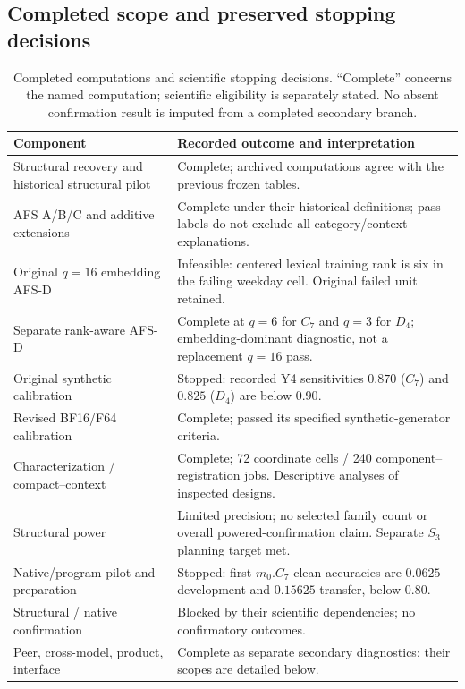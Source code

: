 \subsection{Completed scope and preserved stopping decisions}
\begin{table}[H]\centering\small
\caption{Completed computations and scientific stopping decisions. ``Complete'' concerns the named computation; scientific eligibility is separately stated. No absent confirmation result is imputed from a completed secondary branch.}
\label{tab:reproduction-status}
\begin{tabular}{p{}p{}}\toprule
Component & Recorded outcome and interpretation \\\midrule
Structural recovery and historical structural pilot & Complete; archived computations agree with the previous frozen tables. \\
AFS A/B/C and additive extensions & Complete under their historical definitions; pass labels do not exclude all category/context explanations. \\
Original $q=16$ embedding AFS-D & Infeasible: centered lexical training rank is six in the failing weekday cell. Original failed unit retained. \\
Separate rank-aware AFS-D & Complete at $q=6$ for $C_7$ and $q=3$ for $D_4$; embedding-dominant diagnostic, not a replacement $q=16$ pass. \\
Original synthetic calibration & Stopped: recorded Y4 sensitivities $0.870$ ($C_7$) and $0.825$ ($D_4$) are below $0.90$. \\
Revised BF16/F64 calibration & Complete; passed its specified synthetic-generator criteria. \\
Characterization / compact--context & Complete; 72 coordinate cells / 240 component--registration jobs. Descriptive analyses of inspected designs. \\
Structural power & Limited precision; no selected family count or overall powered-confirmation claim. Separate $S_3$ planning target met. \\
Native/program pilot and preparation & Stopped: first $m_0.C_7$ clean accuracies are $0.0625$ development and $0.15625$ transfer, below $0.80$. \\
Structural / native confirmation & Blocked by their scientific dependencies; no confirmatory outcomes. \\
Peer, cross-model, product, interface & Complete as separate secondary diagnostics; their scopes are detailed below. \\
\bottomrule\end{tabular}
\end{table}
\FloatBarrier

